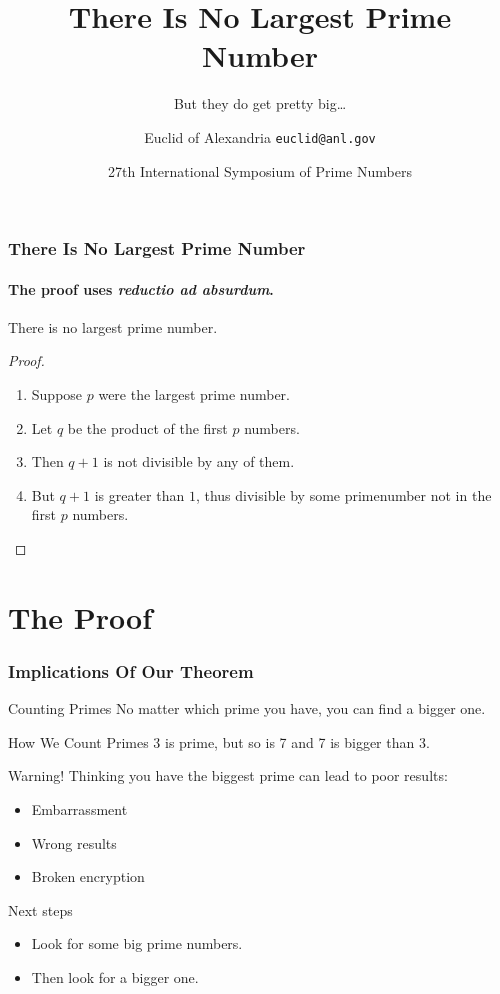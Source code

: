 \documentclass[aspectratio=149]{beamer}
\title{There Is No Largest Prime Number}
\subtitle{But they do get pretty big\ldots}
\date[ISPN ’80]{27th International Symposium of Prime Numbers}
\author[Euclid]{Euclid of Alexandria \texttt{euclid@anl.gov}}
\begin{document}
\begin{frame}
\titlepage
\end{frame}

\begin{frame}
  \frametitle{There Is No Largest Prime Number}
  \framesubtitle{The proof uses \textit{reductio ad absurdum}.}
  \begin{theorem}
    There is no largest prime number.
  \end{theorem}
  \begin{proof}
    \begin{enumerate}
    \item<1-| alert@1> Suppose $p$ were the largest prime number.
    \item<2-> Let $q$ be the product of the first $p$ numbers.
    \item<3-> Then $q+1$ is not divisible by any of them.
    \item<1-> But $q + 1$ is greater than $1$, thus divisible by some primenumber not in the first $p$ numbers.
      \qedhere
    \end{enumerate}
  \end{proof}
\end{frame}

\section{The Proof}

\begin{frame}{}
\tableofcontents
\end{frame}

\begin{frame}
  \frametitle{Implications Of Our Theorem}
  \begin{block}{Counting Primes}
    No matter which prime you have, you can find a bigger one.
  \end{block}
  \begin{exampleblock}{How We Count Primes}
    3 is prime, but so is 7 and 7 is bigger than 3.
  \end{exampleblock}
  \begin{alertblock}{Warning!}
    Thinking you have the biggest prime can lead to poor results:
    \begin{itemize}
    \item Embarrassment
    \item Wrong results
    \item Broken encryption
    \end{itemize}
  \end{alertblock}
\end{frame}

\begin{frame}{Next steps}
  \begin{itemize}
  \item Look for some big prime numbers.
  \item Then look for a bigger one.
  \end{itemize}
\end{frame}
\end{document}
